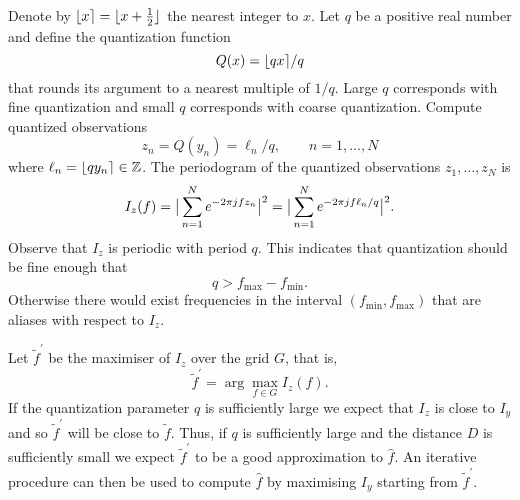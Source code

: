 \documentclass[10pt,twocolumn,twoside]{IEEEtran}
\begin{document}
Denote by ${\left\lfloor x \right\rceil} = {\lfloor x + \tfrac{1}{2} \rfloor}$ the nearest integer to $x$.  %
Let $q$ be a positive real number and define the quantization function
\[
Q(x) = {\left\lfloor qx \right\rceil}/q
\]
that rounds its argument to a nearest multiple of $1/q$.  Large $q$ corresponds with fine quantization and small $q$ corresponds with coarse quantization.  Compute quantized observations
\[
z_n = Q(y_n) =  \ell_n/q, \qquad n = 1,\dots,N
\] 
where $\ell_n = {\left\lfloor qy_n \right\rceil} \in {\mathbb Z}$.  The periodogram of the quantized observations $z_1,\dots,z_N$ is
\begin{align*}
I_z(f) = \big\vert  \sum_{n=1}^N e^{ -2\pi j f z_n}  \big\vert^2 = \big\vert  \sum_{n=1}^N e^{ -2\pi j f \ell_n/q}  \big\vert^2.
\end{align*}
Observe that $I_z$ is periodic with period $q$.  This indicates that quantization should be fine enough that 
\begin{equation}\label{eq:boundaliasingP}
q > f_{\text{max}} - f_{\text{min}}.
\end{equation}
Otherwise there would exist frequencies in the interval $(f_{\text{min}}, f_{\text{max}})$ that are aliases with respect to $I_z$.  %

Let $\widetilde{f}^\prime$ be the maximiser of $I_z$ over the grid $G$, that is,
\[
\widetilde{f}^\prime = \arg\max_{f \in G} I_z(f).
\]
If the quantization parameter $q$ is sufficiently large we expect that $I_z$ is close to $I_y$ and so $\widetilde{f}^\prime$ will be close to $\widetilde{f}$.  Thus, if $q$ is sufficiently large and the distance $D$ is sufficiently small we expect $\widetilde{f}^\prime$ to be a good approximation to $\hat{f}$.  An iterative procedure %
can then be used to compute $\hat{f}$ by maximising $I_y$ starting from $\widetilde{f}^\prime$.  

\newcommand{\ellmin}{\ell_{\text{min}}}
\newcommand{\ellmax}{\ell_{\text{max}}}
\end{document}
